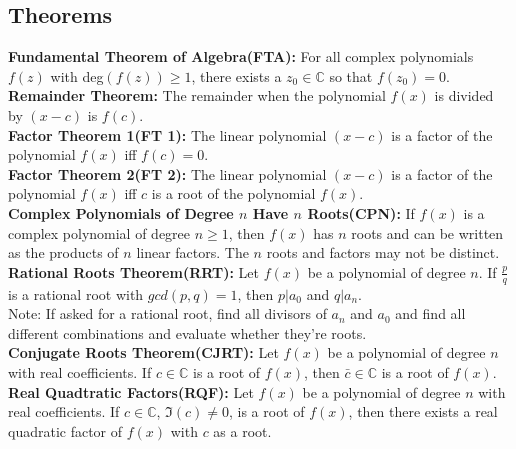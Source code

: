 \documentclass[12pt]{report}
\begin{document}
		\subsection{Theorems}
			\textbf{Fundamental Theorem of Algebra(FTA):} For all complex polynomials $f(z)$ with deg$(f(z)) \geq 1$, there exists a $z_0 \in \mathbb{C}$ so that $f(z_0) = 0$. \\
			\textbf{Remainder Theorem:} The remainder when the polynomial $f(x)$ is divided by $(x-c)$ is $f(c)$. \\
			\textbf{Factor Theorem 1(FT 1):} The linear polynomial $(x-c)$ is a factor of the polynomial $f(x)$ iff $f(c)=0$.\\
			\textbf{Factor Theorem 2(FT 2):} The linear polynomial $(x-c)$ is a factor of the polynomial $f(x)$ iff $c$ is a root of the polynomial $f(x)$.\\
			\textbf{Complex Polynomials of Degree $n$ Have $n$ Roots(CPN):} If $f(x)$ is a complex polynomial of degree $n \geq 1$, then $f(x)$ has $n$ roots and can be written as the products of $n$ linear factors. The $n$ roots and factors may not be distinct. \\
			\textbf{Rational Roots Theorem(RRT):} Let $f(x)$ be a polynomial of degree $n$. If $\frac{p}{q}$ is a rational root with $gcd(p,q) = 1$, then $p|a_0$ and $q|a_n$. \\
			Note: If asked for a rational root, find all divisors of $a_n$ and $a_0$ and find all different combinations and evaluate whether they're roots. \\
			\textbf{Conjugate Roots Theorem(CJRT):} Let $f(x)$ be a polynomial of degree $n$ with real coefficients. If $c \in \mathbb{C}$ is a root of $f(x)$, then $\bar{c} \in \mathbb{C}$ is a root of $f(x)$. \\
			\textbf{Real Quadtratic Factors(RQF):} Let $f(x)$ be a polynomial of degree $n$ with real coefficients. If $c \in \mathbb{C}$, $\Im(c) \neq 0$, is a root of $f(x)$, then there exists a real quadratic factor of $f(x)$ with $c$ as a root.
\end{document}
